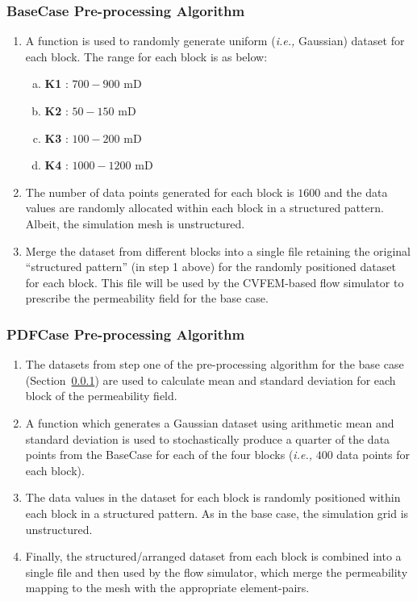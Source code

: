 \documentclass[preprint,12pt]{elsarticle}
\newcommand{\ie}{{\it i.e., }}
\begin{document}
\subsubsection{BaseCase Pre-processing Algorithm}\label{subsubsection:basecase_preprocess_algorithm}
\begin{enumerate}[1.]
  \item A function is used to randomly generate uniform (\ie Gaussian) dataset for each block. The range for each block is as below:
  \begin{enumerate}[a)]
    \item \textbf{K1} : $700 - 900$ mD
    \item \textbf{K2} : $50 - 150$ mD
    \item \textbf{K3} : $100 - 200$ mD
    \item \textbf{K4} : $1000 - 1200$ mD
  \end{enumerate}                                                    
  \item The number of data points generated for each block is $1600$ and the data values are randomly allocated within each block in a structured pattern. Albeit, the simulation mesh is unstructured.
  \item Merge the dataset from different blocks into a single file retaining the original ``structured pattern'' (in step 1 above) for the randomly positioned dataset for each block. This file will be used by the CVFEM-based flow simulator to prescribe the permeability field for the base case.
\end{enumerate}

\subsubsection{PDFCase Pre-processing Algorithm}\label{subsubsection:pdfcase_preprocess_algorithm}
\begin{enumerate}[1.]
  \item The datasets from step one of the pre-processing algorithm for the base case (Section~\ref{subsubsection:basecase_preprocess_algorithm}) are used to calculate mean and standard deviation for each block of the permeability field.
  \item A function which generates a Gaussian dataset using arithmetic mean and standard deviation is used to stochastically produce a quarter of the data points from the BaseCase for each of the four blocks  (\ie $400$ data points for each block).
  \item The data values in the dataset for each block is randomly positioned within each block in a structured pattern. As in the base case, the simulation grid is unstructured.
  \item Finally, the structured/arranged dataset from each block is combined into a single file and then used by the flow simulator, which merge the permeability mapping to the mesh with the appropriate element-pairs.
\end{enumerate}
\end{document}
